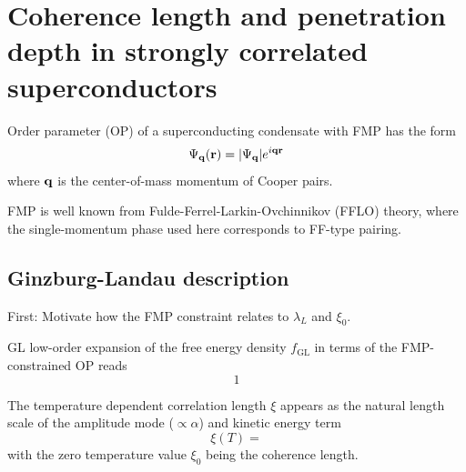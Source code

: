 \documentclass[../main.tex]{subfiles}
\begin{document}
\chapter{Coherence length and penetration depth in strongly correlated superconductors}\label{ch:coherence-length-and-penetration-depth-in-strongly-correlated-superconductors}


Order parameter (OP) of a superconducting condensate with FMP has the form
\begin{equation}
    \Psi_{\bm{\mathrm{q}}} (\bm{\mathrm{r}}) = \vert \Psi_{\bm{\mathrm{q}}} \vert e^{i \bm{\mathrm{q}} \bm{\mathrm{r}}}
\end{equation}
where \(\bm{\mathrm{q}}\) is the center-of-mass momentum of Cooper pairs.

FMP is well known from Fulde-Ferrel-Larkin-Ovchinnikov (FFLO) theory, where the single-momentum phase used here corresponds to FF-type pairing. 

\section{Ginzburg-Landau description}

First: Motivate how the FMP constraint relates to \(\lambda_L\) and \(\xi_0\).

GL low-order expansion of the free energy density \(f_{\mathrm{GL}}\) in terms of the FMP-constrained OP reads
\begin{equation}
    1
\end{equation}


The temperature dependent correlation length \(\xi\) appears as the natural length scale of the amplitude mode (\(\propto \alpha\)) and kinetic energy term
\begin{equation}
    \xi (T) =
\end{equation}
with the zero temperature value \(\xi_0\) being the coherence length.



\end{document}
